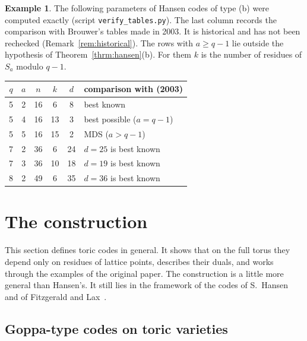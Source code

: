 \documentclass[12pt,letterpaper]{article}
\numberwithin{equation}{section}
\theoremstyle{definition}
\newtheorem{example}[theorem]{Example}
\theoremstyle{remark}
\begin{document}
\begin{example}\label{ex:hansenb}
The following parameters of Hansen codes of type (b) were computed exactly
(script \texttt{verify\_tables.py}). The last column records the comparison
with Brouwer's tables made in 2003. It is historical and has not been
rechecked (Remark~\ref{rem:historical}). The rows with $a\ge q-1$ lie outside
the hypothesis of Theorem~\ref{thrm:hansen}(b). For them $k$ is the number of
residues of $S_a$ modulo $q-1$.
\begin{center}
\begin{tabular}{@{}cccccl@{}}
\toprule
$q$ & $a$ & $n$ & $k$ & $d$ & comparison with \cite{Br98} (2003)\\
\midrule
5 & 2 & 16 & 6 & 8 & best known\\
5 & 4 & 16 & 13 & 3 & best possible ($a=q-1$)\\
5 & 5 & 16 & 15 & 2 & MDS ($a>q-1$)\\
7 & 2 & 36 & 6 & 24 & $d=25$ is best known\\
7 & 3 & 36 & 10 & 18 & $d=19$ is best known\\
8 & 2 & 49 & 6 & 35 & $d=36$ is best known\\
\bottomrule
\end{tabular}
\end{center}
\end{example}

\section{The construction}\label{sec:toric}

This section defines toric codes in general. It shows that on the full torus
they depend only on residues of lattice points, describes their duals, and
works through the examples of the original paper. The construction is a
little more general than Hansen's. It still lies in the framework of the codes
of S.~Hansen~\cite{SH01} and of Fitzgerald and Lax~\cite{FL98}.

\subsection{Goppa-type codes on toric varieties}
\end{document}
